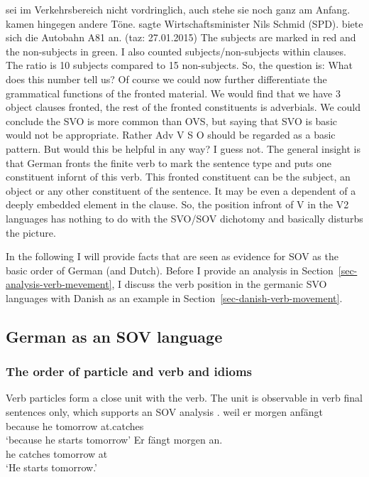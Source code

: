 sei im Verkehrsbereich nicht vordringlich, auch stehe sie noch ganz am
Anfang.  
kamen hingegen andere Töne.  sagte Wirtschaftsminister Nils Schmid (SPD).  biete sich die Autobahn A81 an. (taz: 27.01.2015)
\z
The subjects are marked in red and the non-subjects in green. I also counted subjects/non-subjects
within clauses. The ratio is 10 subjects compared to 15 non-subjects. So, the question is: What does
this number tell us? Of course we could now further differentiate the grammatical functions of the
fronted material. We would find that we have 3 object clauses fronted, the rest of the fronted
constituents is adverbials. We could conclude the SVO is more common than OVS, but saying that SVO
is basic would not be appropriate. Rather Adv V S O should be regarded as a basic pattern. But would
this be helpful in any way? I guess not. The general insight is that German fronts the finite verb
to mark the sentence type and puts one constituent infornt of this verb. This fronted constituent
can be the subject, an object or any other constituent of the sentence. It may be even a dependent
of a deeply embedded element in the clause. So, the position infront of V in the V2 languages has
nothing to do with the SVO/SOV dichotomy and basically disturbs the picture. 

In the following I will provide facts that are seen as evidence for SOV as the basic order of German
(and Dutch). Before I provide an analysis in Section~\ref{sec-analysis-verb-mevement}, I discuss the
verb position in the germanic SVO languages with Danish as an example in Section~\ref{sec-danish-verb-movement}.

\subsection{German as an SOV language}

\subsubsection{The order of particle and verb and idioms}

Verb particles form a close unit with the verb. The unit is observable in verb final sentences only,
which supports an SOV analysis \citep[]{Bierwisch63a}. 
\eal
\ex 
\gll weil er morgen anfängt\\
     because he tomorrow at.catches\\
\glt `because he starts tomorrow'
\ex 
\gll Er fängt morgen an.\\
     he catches tomorrow at\\
\glt `He starts tomorrow.'
\zl

